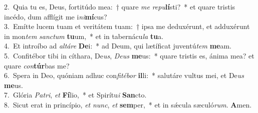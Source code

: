 {2.~}Quia tu es, Deus, fortitúdo mea:~† quare \textit{me} \textit{re}\textit{pu}\textbf{lí}sti?~* et quare tristis incédo, dum afflígit me i\textit{ni}\textbf{mí}cus?\\
{3.~}Emítte lucem tuam et veritátem tuam:~† ipsa me deduxérunt, et adduxérunt in mon\textit{tem} \textit{san}\textit{ctum} \textbf{tu}um,~* et in tabernácu\textit{la} \textbf{tu}a.\\
{4.~}Et introíbo ad \textit{al}\textit{tá}\textit{re} \textbf{De}i:~* ad Deum, qui lætíficat juventú\textit{tem} \textbf{me}am.\\
{5.~}Confitébor tibi in cíthara, De\textit{us}, \textit{De}\textit{us} \textbf{me}us:~* quare tristis es, ánima mea? et quare \textit{con}\textbf{túr}bas me?\\
{6.~}Spera in Deo, quóniam adhuc con\textit{fi}\textit{té}\textit{bor} \textbf{il}li:~* salutáre vultus mei, et De\textit{us} \textbf{me}us.\\
{7.~}Glória \textit{Pa}\textit{tri}, \textit{et} \textbf{Fí}lio,~* et Spirítu\textit{i} \textbf{San}cto.\\
{8.~}Sicut erat in princípio, \textit{et} \textit{nunc}, \textit{et} \textbf{sem}per,~* et in sǽcula sæculó\textit{rum}. \textbf{A}men.\\

